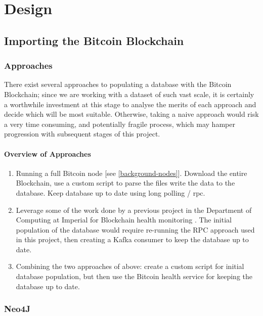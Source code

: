 \chapter{Design}

\section{Importing the Bitcoin Blockchain}

\subsection{Approaches}
There exist several approaches to populating a database with the Bitcoin Blockchain; since we are working with a dataset of such vast scale, it is certainly a worthwhile investment at this stage to analyse the merits of each approach and decide which will be most suitable. Otherwise, taking a naive approach would risk a very time consuming, and potentially fragile process, which may hamper progression with subsequent stages of this project. 

\subsubsection{Overview of Approaches}
\begin{enumerate}
    \item Running a full Bitcoin node [see \ref{background-nodes}]. Download the entire Blockchain, use a custom script to parse the files write the data to the database. Keep database up to date using long polling / \gls{rpc}. 
    \item Leverage some of the work done by a previous project in the Department of Computing at Imperial for Blockchain health monitoring \cite{RefWorks:doc:5c6bd151e4b041254f892045}. The initial population of the database would require re-running the RPC approach used in this project, then creating a Kafka consumer to keep the database up to date. 
    \item Combining the two approaches of above: create a custom script for initial database population, but then use the Bitcoin health service for keeping the database up to date. 
\end{enumerate}


\subsection{Neo4J}

